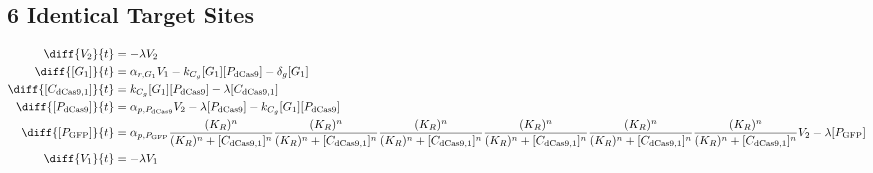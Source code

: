 \subsection{6 Identical Target Sites}
\label{s:Multisite_6_gRNA_Repression}

\begin{align}
\diff{\constructGen{2}}{t} & = - \dilutionRate{}\constructGen{2}\\
\diff{\conc{\gRna{1}}}{t} & =  \txRate{\gRna{1}}\constructGen{1} - \gRnaBind{}\conc{\gRna{1}}\conc{\proSp{\cas{}}} - \rnaDegradeRate{}\conc{\gRna{1}}\\
\diff{\conc{\cplx{\cas}{1}}}{t} & =  \gRnaBind{}\conc{\gRna{1}}\conc{\proSp{\cas{}}} - \dilutionRate{}\conc{\cplx{\cas}{1}}\\
\diff{\conc{\proSp{\cas{}}}}{t} & =  \txtlRate{\proSp{\cas{}}}\constructGen{2} - \dilutionRate{}\conc{\proSp{\cas{}}} - \gRnaBind{}\conc{\gRna{1}}\conc{\proSp{\cas{}}}\\
\diff{\conc{\proSp{\gfp}}}{t} & =  \txtlRate{\proSp{\gfp}}\frac{(K_R)^n}{(K_R)^n + \conc{\cplx{\cas}{1}}^n}\frac{(K_R)^n}{(K_R)^n + \conc{\cplx{\cas}{1}}^n}\frac{(K_R)^n}{(K_R)^n + \conc{\cplx{\cas}{1}}^n}\frac{(K_R)^n}{(K_R)^n + \conc{\cplx{\cas}{1}}^n}\frac{(K_R)^n}{(K_R)^n + \conc{\cplx{\cas}{1}}^n}\frac{(K_R)^n}{(K_R)^n + \conc{\cplx{\cas}{1}}^n}\constructGen{2} - \dilutionRate{}\conc{\proSp{\gfp}}\\
\diff{\constructGen{1}}{t} & = - \dilutionRate{}\constructGen{1}
\end{align}

